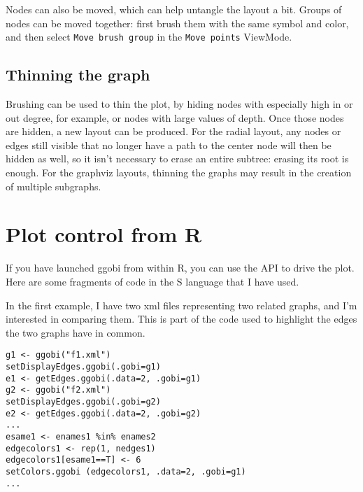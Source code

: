 \documentclass[11pt]{article}
\begin{document}
Nodes can also be moved, which can help untangle the layout a bit.
Groups of nodes can be moved together: first brush them with
the same symbol and color, and then select {\tt Move brush group}
in the {\tt Move points} ViewMode.


\subsection{Thinning the graph}

Brushing can be used to thin the plot, by hiding nodes with especially
high in or out degree, for example, or nodes with large values of depth.
Once those nodes are hidden, a new layout can be produced.
For the radial layout, any nodes or edges still visible that no longer
have a path to the center node will then be hidden as well, so it isn't
necessary to erase an entire subtree: erasing its root is enough.
For the graphviz layouts, thinning the graphs may result in the
creation of multiple subgraphs.

\section{Plot control from R}

If you have launched ggobi from within R, you can use the API to
drive the plot.  Here are some fragments of code in the S language
that I have used.

In the first example, I have two xml files representing two
related graphs, and I'm interested in comparing them.  This is
part of the code used to highlight the edges the two graphs
have in common.

\begin{verbatim}
g1 <- ggobi("f1.xml")
setDisplayEdges.ggobi(.gobi=g1)
e1 <- getEdges.ggobi(.data=2, .gobi=g1)
g2 <- ggobi("f2.xml")
setDisplayEdges.ggobi(.gobi=g2)
e2 <- getEdges.ggobi(.data=2, .gobi=g2)
...
esame1 <- enames1 %in% enames2
edgecolors1 <- rep(1, nedges1)
edgecolors1[esame1==T] <- 6
setColors.ggobi (edgecolors1, .data=2, .gobi=g1)
...
\end{verbatim}
\end{document}
